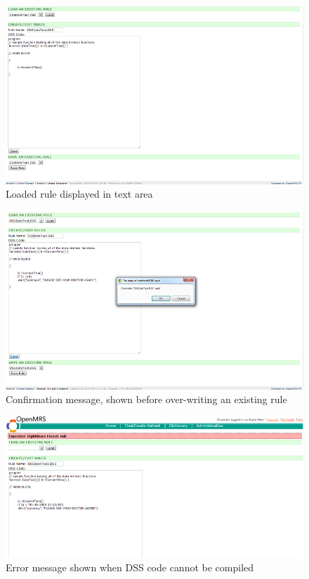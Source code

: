 \documentclass[12pt,letterpaper]{article}
\begin{document}
\begin{figure}\begin{center}
\includegraphics[width=6.5in]{user_guide/load_rule_shown.png}
\end{center}
\caption{Loaded rule displayed in text area}
\label{fig:LOAD_RULE_SHOWN}
\end{figure}

\begin{figure}\begin{center}
\includegraphics[width=6.5in]{user_guide/modify_confirmation.png}
\end{center}
\caption{Confirmation message, shown before over-writing an existing rule}
\label{fig:MODIFY_CONFIRMATION}
\end{figure}

\begin{figure}\begin{center}
\includegraphics[width=6.5in]{user_guide/modify_error.png}
\end{center}
\caption{Error message shown when DSS code cannot be compiled}
\label{fig:MODIFY_ERROR}
\end{figure}
\end{document}
